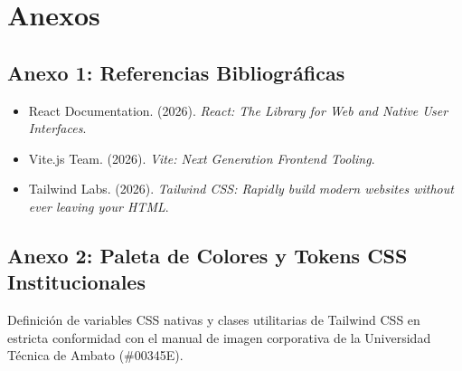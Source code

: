 \documentclass[12pt,a4paper]{article}
\begin{document}
\vspace{0.4cm}

\section{Anexos}

\subsection*{Anexo 1: Referencias Bibliográficas}
\begin{itemize}[leftmargin=1.5em, itemsep=2pt]
    \item React Documentation. (2026). \textit{React: The Library for Web and Native User Interfaces}.
    \item Vite.js Team. (2026). \textit{Vite: Next Generation Frontend Tooling}.
    \item Tailwind Labs. (2026). \textit{Tailwind CSS: Rapidly build modern websites without ever leaving your HTML}.
\end{itemize}

\subsection*{Anexo 2: Paleta de Colores y Tokens CSS Institucionales}
Definición de variables CSS nativas y clases utilitarias de Tailwind CSS en estricta conformidad con el manual de imagen corporativa de la Universidad Técnica de Ambato (\#00345E).
\end{document}
